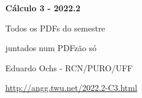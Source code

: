 \documentclass[oneside,12pt]{article}
\begin{document}

\def\u#1{\par{\footnotesize \url{#1}}}

\def\drafturl{http://angg.twu.net/LATEX/2022-2-C3.pdf}
\def\drafturl{http://angg.twu.net/2022.2-C3.html}
\def\draftfooter{\tiny \href{\drafturl}{\jobname{}} \ColorBrown{\shorttoday{} \hours}}



%

\thispagestyle{empty}

\begin{center}

\vspace*{1.2cm}

{\bf \Large Cálculo 3 - 2022.2}

\bsk

Todos os PDFs do semestre

juntados num PDFzão só

\bsk

Eduardo Ochs - RCN/PURO/UFF

\url{http://angg.twu.net/2022.2-C3.html}

\end{center}

\newpage

\def\incl#1{}

\incl{2022-2-C3-intro}

\incl{2022-2-C3-tipos}

\incl{2022-2-C3-taylor}

\incl{2022-2-C3-superficies}
\end{document}
